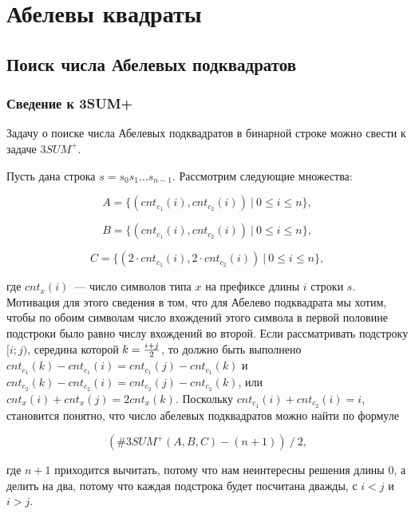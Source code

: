 \section{Абелевы квадраты}

\subsection{Поиск числа Абелевых подквадратов}

\subsubsection{Сведение к 3SUM+}
Задачу о поиске числа Абелевых подквадратов в бинарной строке можно свести к задаче $3SUM^+$.

Пусть дана строка $s=s_0s_1 \ldots s_{n-1}$. Рассмотрим следующие множества:

\begin{equation}
A = \{ (cnt_{c_1}(i), cnt_{c_2}(i))\ |\ 0 \le i \le n \},
\end{equation}

\begin{equation}
B = \{ (cnt_{c_1}(i), cnt_{c_2}(i))\ |\ 0 \le i \le n \},
\end{equation}

\begin{equation}
C = \{ (2 \cdot cnt_{c_1}(i), 2 \cdot cnt_{c_2}(i))\ |\ 0 \le i \le n \},
\end{equation}


где $cnt_x(i)$~--- число символов типа $x$ на префиксе длины $i$ строки $s$. Мотивация для этого сведения в том, что для Абелево подквадрата мы хотим, чтобы по обоим символам число вхождений этого символа в первой половине подстроки было равно числу вхождений во второй. Если рассматривать подстроку $[i; j)$, середина которой $k={{i+j} \over 2}$, то должно быть выполнено $cnt_{c_1}(k)-cnt_{c_1}(i)=cnt_{c_1}(j)-cnt_{c_1}(k)$ и $cnt_{c_2}(k)-cnt_{c_2}(i)=cnt_{c_2}(j)-cnt_{c_2}(k)$, или $cnt_x(i)+cnt_x(j)=2cnt_x(k)$. Поскольку $cnt_{c_1}(i)+cnt_{c_2}(i)=i$, становится понятно, что число абелевых подквадратов можно найти по формуле 

\begin{equation}
(\#3SUM^+(A, B, C) - (n+1))\ /\ 2,
\end{equation}

где $n+1$ приходится вычитать, потому что нам неинтересны решения длины 0, а делить на два, потому что каждая подстрока будет посчитана дважды, с $i<j$ и $i>j$.

